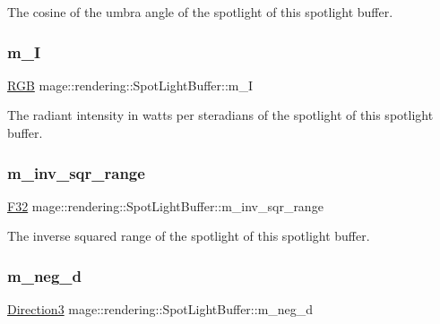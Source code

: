 The cosine of the umbra angle of the spotlight of this spotlight buffer. \hypertarget{structmage_1_1rendering_1_1_spot_light_buffer_ab67a7ecde450e0096563c4be789156c9}{}\label{structmage_1_1rendering_1_1_spot_light_buffer_ab67a7ecde450e0096563c4be789156c9} 
\subsubsection{\texorpdfstring{m\+\_\+I}{m\_I}}
{\footnotesize\ttfamily \hyperlink{structmage_1_1_r_g_b}{R\+GB} mage\+::rendering\+::\+Spot\+Light\+Buffer\+::m\+\_\+I}

The radiant intensity in watts per steradians of the spotlight of this spotlight buffer. \hypertarget{structmage_1_1rendering_1_1_spot_light_buffer_a279a981f476ecbc4efd875626071d046}{}\label{structmage_1_1rendering_1_1_spot_light_buffer_a279a981f476ecbc4efd875626071d046} 
\subsubsection{\texorpdfstring{m\+\_\+inv\+\_\+sqr\+\_\+range}{m\_inv\_sqr\_range}}
{\footnotesize\ttfamily \hyperlink{namespacemage_aa97e833b45f06d60a0a9c4fc22ae02c0}{F32} mage\+::rendering\+::\+Spot\+Light\+Buffer\+::m\+\_\+inv\+\_\+sqr\+\_\+range}

The inverse squared range of the spotlight of this spotlight buffer. \hypertarget{structmage_1_1rendering_1_1_spot_light_buffer_a0a52ef76133f10b93030f86ce628b334}{}\label{structmage_1_1rendering_1_1_spot_light_buffer_a0a52ef76133f10b93030f86ce628b334} 
\subsubsection{\texorpdfstring{m\+\_\+neg\+\_\+d}{m\_neg\_d}}
{\footnotesize\ttfamily \hyperlink{structmage_1_1_direction3}{Direction3} mage\+::rendering\+::\+Spot\+Light\+Buffer\+::m\+\_\+neg\+\_\+d}

